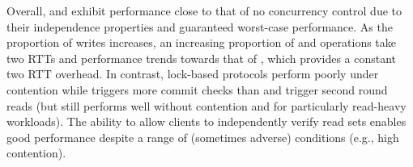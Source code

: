 Overall, \rapl and \rapb exhibit performance close to that of no
concurrency control due to their independence properties and
guaranteed worst-case performance. As the proportion of writes
increases, an increasing proportion of \rapl and \rapb operations take
two RTTs and performance trends towards that of \raps, which provides
a constant two RTT overhead. In contrast, lock-based protocols perform
poorly under contention while \mstr triggers more commit checks than
\rapl and \rapb trigger second round reads (but still performs well
without contention and for particularly read-heavy workloads). The
ability to allow clients to independently verify read sets enables
good performance despite a range of (sometimes adverse) conditions
(e.g., high contention).

